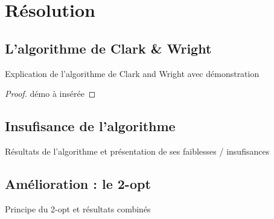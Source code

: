 \documentclass[handout]{beamer}
\begin{document}
	\section{Résolution}

	\subsection{L'algorithme de Clark \& Wright}

	\begin{frame}
		Explication de l'algorithme de Clark and Wright avec démonstration
		
		\begin{proof}
			démo à insérée
		\end{proof}
	
	\end{frame}

	\subsection{Insufisance de l'algorithme}

	\begin{frame}
		Résultats de l'algorithme et présentation de ses faiblesses / insufisances
	\end{frame}

	\subsection{Amélioration : le 2-opt}

	\begin{frame}
		Principe du 2-opt et résultats combinés
	\end{frame}
\end{document}
